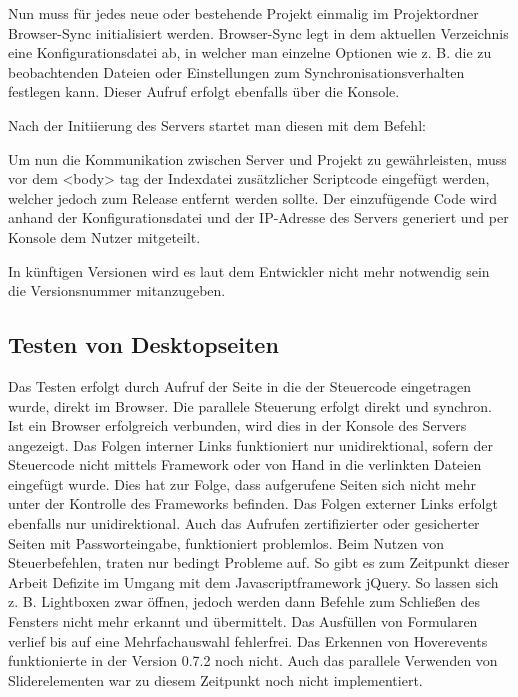 	Nun muss für jedes neue oder bestehende Projekt einmalig im Projektordner Browser-Sync initialisiert werden. Browser-Sync legt in dem aktuellen Verzeichnis eine Konfigurationsdatei ab, in welcher man einzelne Optionen wie z. B. die zu beobachtenden Dateien oder Einstellungen zum Synchronisationsverhalten festlegen kann. Dieser Aufruf erfolgt ebenfalls über die Konsole.
	
	Nach der Initiierung des Servers startet man diesen mit dem Befehl:
	
	Um nun die Kommunikation zwischen Server und Projekt zu gewährleisten, muss vor dem <body> tag der Indexdatei zusätzlicher Scriptcode eingefügt werden, welcher jedoch zum Release entfernt werden sollte. Der einzufügende Code  wird anhand der Konfigurationsdatei und der IP-Adresse des Servers generiert und per Konsole dem Nutzer mitgeteilt.
	
	In künftigen Versionen wird es laut dem Entwickler nicht mehr notwendig sein die Versionsnummer mitanzugeben.
	
	\subsection{Testen von Desktopseiten}
	Das Testen erfolgt durch Aufruf der Seite in die der Steuercode eingetragen wurde, direkt im Browser. Die parallele Steuerung erfolgt direkt und synchron. Ist ein Browser erfolgreich verbunden, wird dies in der Konsole des Servers angezeigt.
	Das Folgen interner Links funktioniert nur unidirektional, sofern der Steuercode nicht mittels \Gls{Framework} oder von Hand in die verlinkten Dateien eingefügt wurde. Dies hat zur Folge, dass aufgerufene Seiten sich nicht mehr unter der Kontrolle des \Gls{Framework}s befinden. Das Folgen externer Links erfolgt ebenfalls nur unidirektional. Auch das Aufrufen zertifizierter oder \gls{gesichert}er Seiten mit Passworteingabe, funktioniert problemlos. Beim Nutzen von Steuerbefehlen, traten nur bedingt Probleme auf. So gibt es zum Zeitpunkt dieser Arbeit Defizite im Umgang mit dem \Gls{Javascript}framework jQuery. So lassen sich z. B. Lightboxen zwar öffnen, jedoch werden dann Befehle zum \mbox{Schließen} des Fensters nicht mehr erkannt und übermittelt. Das Ausfüllen von Formularen verlief bis auf eine Mehrfachauswahl fehlerfrei. Das Erkennen von Hoverevents funktionierte in der Version 0.7.2 noch nicht. Auch das parallele Verwenden von Sliderelementen war zu diesem Zeitpunkt noch nicht implementiert.
	
